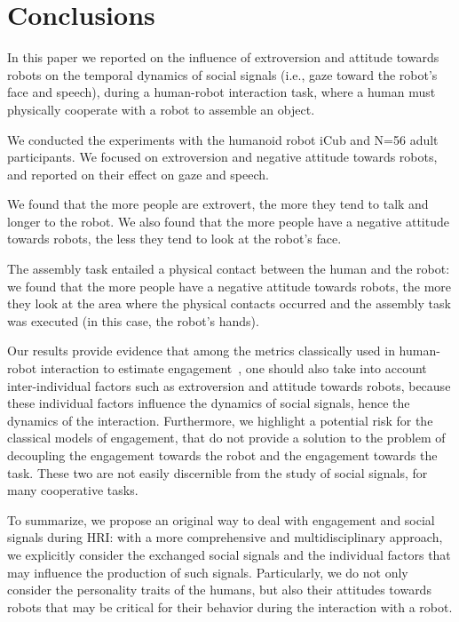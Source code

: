 \documentclass[twocolumn]{svjour3}          %
\begin{document}
\section{Conclusions}

In this paper we reported on the influence of extroversion and attitude towards robots on the temporal dynamics of social signals (i.e., gaze toward the robot's face and speech), during a human-robot interaction task, where a human must physically cooperate with a robot to assemble an object. 

We conducted the experiments with the humanoid robot iCub and N=56 adult participants. 
We focused on extroversion and negative attitude towards robots, and reported on their effect on gaze and speech.

We found that the more people are extrovert, the more they tend to talk and longer to the robot. We also found that the more people have a negative attitude towards robots, the less they tend to look at the robot's face. 

The assembly task entailed a physical contact between the human and the robot: we found that the more people have a negative attitude towards robots, the more they look at the area where the physical contacts occurred and the assembly task was executed  (in this case, the robot's hands). 

Our results provide evidence that among the metrics classically used in human-robot interaction to estimate engagement~\cite{rich2010recognizing}, one should also take into account inter-individual factors such as extroversion and attitude towards robots, because these individual factors influence the dynamics of social signals, hence the dynamics of the interaction. 
Furthermore, we highlight a potential risk for the classical models of engagement, that do not provide a solution to the problem of decoupling the engagement towards the robot and the engagement towards the task. These two are not easily discernible from the study of social signals, for many cooperative tasks.

To summarize, we propose an original way to deal with engagement and social signals during HRI: with a more comprehensive and multidisciplinary approach, we explicitly consider the exchanged social signals and the individual factors that may influence the production of such signals. Particularly, we do not only consider the personality traits of the humans, but also their attitudes towards robots that may be critical for their behavior during the interaction with a robot. 
  
\end{document}
